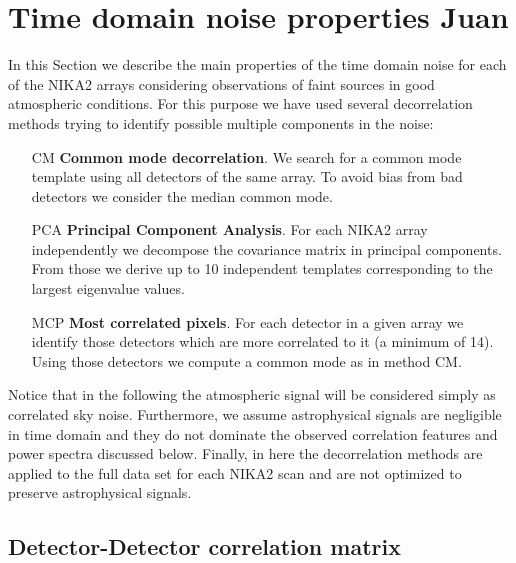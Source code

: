 %
%
%
%


%
%    
%
\section{Time domain noise properties {\color{YellowGreen} Juan}}

In this Section we describe the main properties of the time domain noise for each of the NIKA2 arrays considering
observations of faint sources in good atmospheric conditions. For this purpose we have used several decorrelation methods trying to identify possible multiple components in the noise:

\begin{enumerate}
\item[CM] {\bf Common mode decorrelation}. We search for a common mode template using all detectors of the same array. To avoid bias from bad detectors we consider the median common mode.

\item[PCA] {\bf Principal Component Analysis}. For each NIKA2 array independently we decompose the covariance matrix in principal components. From those we derive up to 10 independent templates corresponding to the largest eigenvalue values.

\item[MCP] {\bf Most correlated pixels}. For each detector in a given array we identify those detectors which are more correlated to it (a minimum of 14). Using those detectors we compute a common mode as in method CM. 

\end{enumerate}

Notice that in the following the atmospheric signal will be considered simply as correlated sky noise. Furthermore, we assume astrophysical signals are negligible in time domain and they do not dominate the observed correlation features and power spectra discussed below. Finally, in here the decorrelation methods are applied to the full data set for each NIKA2 scan and are not optimized to preserve astrophysical signals.
 
\subsection{Detector-Detector correlation matrix}


